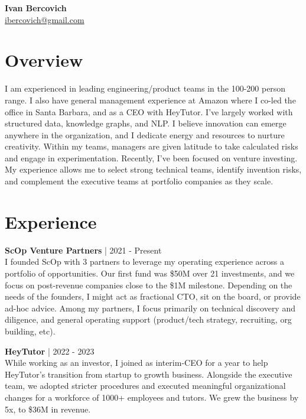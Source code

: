 \documentclass[a4paper,10pt]{article}
\begin{document}
\noindent
\textbf{\Large Ivan Bercovich} \\
\href{mailto:ibercovich@gmail.com}{ibercovich@gmail.com} \\
\vspace{0cm}

\section*{Overview}
\noindent
I am experienced in leading engineering/product teams in the 100-200 person range. I also have general management experience at Amazon where I co-led the office in Santa Barbara, and as a CEO with HeyTutor. I've largely worked with structured data, knowledge graphs, and NLP. I believe innovation can emerge anywhere in the organization, and I dedicate energy and resources to nurture creativity. Within my teams, managers are given latitude to take calculated risks and engage in experimentation. Recently, I’ve been focused on venture investing. My experience allows me to select strong technical teams, identify invention risks, and complement the executive teams at portfolio companies as they scale.

\section*{Experience}

\noindent
\textbf{ScOp Venture Partners} | 2021 - Present \\
I founded ScOp with 3 partners to leverage my operating experience across a portfolio of opportunities. Our first fund was \$50M over 21 investments, and we focus on post-revenue companies close to the \$1M milestone. Depending on the needs of the founders, I might act as fractional CTO, sit on the board, or provide ad-hoc advice. Among my partners, I focus primarily on technical discovery and diligence, and general operating support (product/tech strategy, recruiting, org building, etc).

\vspace{5pt} %

\noindent
\textbf{HeyTutor} | 2022 - 2023 \\
While working as an investor, I joined as interim-CEO for a year to help HeyTutor's transition from startup to growth business. Alongside the executive team, we adopted stricter procedures and executed meaningful organizational changes for a workforce of 1000+ employees and tutors. We grew the business by 5x, to \$36M in revenue.
\end{document}
